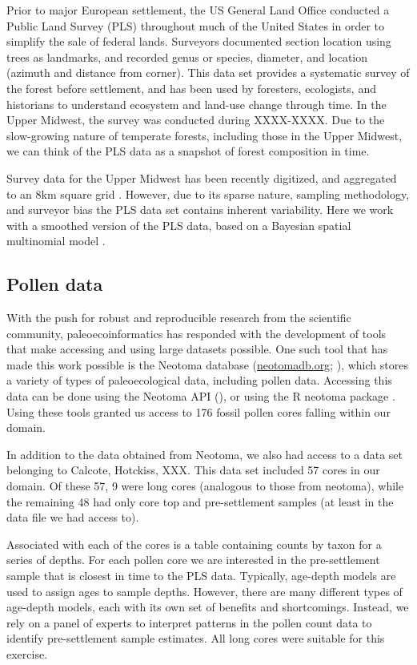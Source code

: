 \documentclass[12pt]{article}
\begin{document}
Prior to major European settlement, the US General
Land Office conducted a Public Land Survey (PLS) throughout much of
the United States in order to simplify the sale of federal
lands. Surveyors documented section location using trees as landmarks,
and recorded genus or species, diameter, and location (azimuth and
distance from corner). This data set provides a systematic survey of
the forest before settlement, and has been used by foresters,
ecologists, and historians to understand ecosystem and land-use change
through time. In the Upper Midwest, the survey was conducted during
XXXX-XXXX. Due to the slow-growing nature of temperate forests, including those in the Upper
Midwest, we can think of the PLS data as a snapshot of
forest composition in time.

Survey data for the Upper Midwest has been recently
digitized, and aggregated to an 8km square grid \cite{XXX}. However,
due to its sparse nature, sampling methodology, and surveyor bias the
PLS data set contains inherent variability. Here we work with a
smoothed version of the PLS data, based on a Bayesian spatial multinomial 
model \cite{XXX}.

\subsection{Pollen data}
With the push for robust and reproducible research from the scientific
community, paleoecoinformatics has responded with the development of
tools that make accessing and using large datasets possible. One such
tool that has made this work possible is the Neotoma database
(\url{neotomadb.org}; \cite{XXX}), which stores a variety of types of
paleoecological data, including pollen data. Accessing this data can
be done using the Neotoma API (), or using the R neotoma package
\cite{XXX}. Using these tools granted us access to 176 fossil pollen
cores falling within our domain.

In addition to the data obtained from Neotoma, we also had access to a
data set belonging to Calcote, Hotckiss, XXX. This data set included
57 cores in our domain. Of these 57, 9 were long cores (analogous to
those from neotoma), while the remaining 48 had only core top and
pre-settlement samples (at least in the data file we had access to).

Associated with each of the cores is a table containing counts by
taxon for a series of depths. For each pollen core we are interested
in the pre-settlement sample that is closest in time to the PLS
data. Typically, age-depth models are used to assign ages to sample
depths. However, there are many different types of age-depth models,
each with its own set of benefits and shortcomings. Instead, we rely
on a panel of experts to interpret patterns in the pollen count data
to identify pre-settlement sample estimates. All long cores were
suitable for this exercise.
\end{document}
